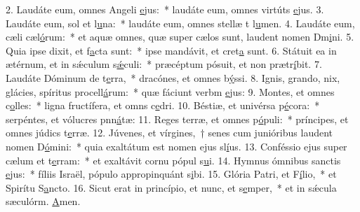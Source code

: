 2. Laudáte eum, omnes Angeli \uline{e}jus:~* laudáte eum, omnes virtúts \uline{e}jus.
3. Laudáte eum, sol et l\uline{u}na:~* laudáte eum, omnes stellæ t l\uline{u}men.
4. Laudáte eum, cæli cæl\uline{ó}rum:~* et aquæ omnes, quæ super cælos sunt, laudent nomen Dm\uline{i}ni.
5. Quia ipse dixit, et f\uline{a}cta sunt:~* ipse mandávit, et cret\uline{a} sunt.
6. Státuit ea in ætérnum, et in sǽculum s\uline{ǽ}culi:~* præcéptum pósuit, et non prætr\uline{í}bit.
7. Laudáte Dóminum de t\uline{e}rra,~* dracónes, et omnes b\uline{ý}ssi.
8. Ignis, grando, nix, glácies, spíritus procell\uline{á}rum:~* quæ fáciunt verbm \uline{e}jus:
9. Montes, et omnes c\uline{o}lles:~* ligna fructífera, et omns c\uline{e}dri.
10. Béstiæ, et univérsa p\uline{é}cora:~* serpéntes, et vólucres pnn\uline{á}tæ:
11. Reges terræ, et omnes p\uline{ó}puli:~* príncipes, et omnes júdics t\uline{e}rræ.
12. Júvenes, et vírgines,~† senes cum junióribus laudent nomen D\uline{ó}mini:~* quia exaltátum est nomen ejus sl\uline{í}us.
13. Conféssio ejus super cælum et t\uline{e}rram:~* et exaltávit cornu pópul s\uline{u}i.
14. Hymnus ómnibus sanctis \uline{e}jus:~* fíliis Israël, pópulo appropinquánt s\uline{i}bi.
15. Glória Patri, et F\uline{í}lio,~* et Spirítu S\uline{a}ncto.
16. Sicut erat in princípio, et nunc, et s\uline{e}mper,~* et in sǽcula sæculórm. \uline{A}men.
